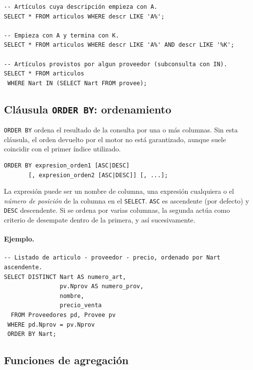 \documentclass[11pt,a4paper]{article}
\begin{document}
\begin{lstlisting}
-- Artículos cuya descripción empieza con A.
SELECT * FROM articulos WHERE descr LIKE 'A%';

-- Empieza con A y termina con K.
SELECT * FROM articulos WHERE descr LIKE 'A%' AND descr LIKE '%K';

-- Artículos provistos por algun proveedor (subconsulta con IN).
SELECT * FROM articulos
 WHERE Nart IN (SELECT Nart FROM provee);
\end{lstlisting}

\subsection{Cláusula \texttt{ORDER BY}: ordenamiento}

\texttt{ORDER BY} ordena el resultado de la consulta por una o más columnas.
Sin esta cláusula, el orden devuelto por el motor no está garantizado, aunque
suele coincidir con el primer índice utilizado.

\begin{lstlisting}
ORDER BY expresion_orden1 [ASC|DESC]
       [, expresion_orden2 [ASC|DESC]] [, ...];
\end{lstlisting}

La expresión puede ser un nombre de columna, una expresión cualquiera o el
\emph{número de posición} de la columna en el \texttt{SELECT}. \texttt{ASC}
es ascendente (por defecto) y \texttt{DESC} descendente. Si se ordena por
varias columnas, la segunda actúa como criterio de desempate dentro de la
primera, y así sucesivamente.

\paragraph{Ejemplo.}

\begin{lstlisting}
-- Listado de articulo - proveedor - precio, ordenado por Nart ascendente.
SELECT DISTINCT Nart AS numero_art,
                pv.Nprov AS numero_prov,
                nombre,
                precio_venta
  FROM Proveedores pd, Provee pv
 WHERE pd.Nprov = pv.Nprov
 ORDER BY Nart;
\end{lstlisting}

\subsection{Funciones de agregación}
\end{document}
